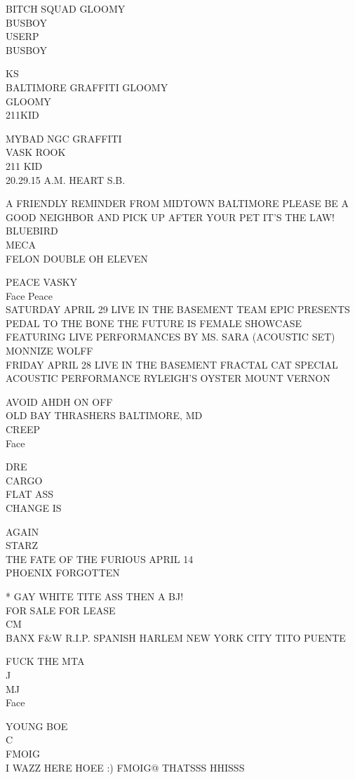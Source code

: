 \documentclass[10pt,letterpaper]{article}
\begin{document}
BITCH SQUAD GLOOMY\\
BUSBOY\\
USERP\\
BUSBOY

KS\\
BALTIMORE GRAFFITI GLOOMY\\
GLOOMY\\
211KID

MYBAD NGC GRAFFITI\\
VASK ROOK\\
211 KID\\
20.29.15 A.M. HEART S.B.

A FRIENDLY REMINDER FROM MIDTOWN BALTIMORE PLEASE BE A GOOD NEIGHBOR AND PICK UP AFTER YOUR PET IT'S THE LAW!\\
BLUEBIRD\\
MECA\\
FELON DOUBLE OH ELEVEN

PEACE VASKY\\
Face Peace\\
SATURDAY APRIL 29 LIVE IN THE BASEMENT TEAM EPIC PRESENTS PEDAL TO THE BONE THE FUTURE IS FEMALE SHOWCASE FEATURING LIVE PERFORMANCES BY MS. SARA (ACOUSTIC SET)  MONNIZE WOLFF\\
FRIDAY APRIL 28 LIVE IN THE BASEMENT FRACTAL CAT SPECIAL ACOUSTIC PERFORMANCE RYLEIGH'S OYSTER MOUNT VERNON

AVOID AHDH ON OFF\\
OLD BAY THRASHERS BALTIMORE, MD\\
CREEP\\
Face

DRE\\
CARGO\\
FLAT ASS\\
CHANGE IS

AGAIN\\
STARZ\\
THE FATE OF THE FURIOUS APRIL 14\\
PHOENIX FORGOTTEN

* GAY WHITE TITE ASS THEN A BJ!\\
FOR SALE FOR LEASE\\
CM\\
BANX F\&W R.I.P. SPANISH HARLEM NEW YORK CITY TITO PUENTE

FUCK THE MTA\\
J\\
MJ\\
Face

YOUNG BOE\\
C\\
FMOIG\\
I WAZZ HERE HOEE :) FMOIG@ THATSSS HHISSS
\end{document}
